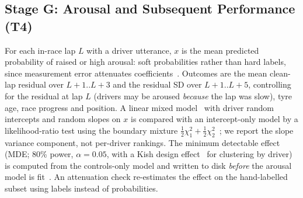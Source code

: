 \subsection{Stage G: Arousal and Subsequent Performance (T4)}
For each in-race lap $L$ with a driver utterance, $x$ is the mean predicted probability of raised or high arousal: soft probabilities rather than hard labels, since measurement error attenuates coefficients~\cite{fuller1987measurement}. Outcomes are the mean clean-lap residual over $L{+}1..L{+}3$ and the residual SD over $L{+}1..L{+}5$, controlling for the residual at lap $L$ (drivers may be aroused \emph{because} the lap was slow), tyre age, race progress and position. A linear mixed model~\cite{seabold2010statsmodels} with driver random intercepts and random slopes on $x$ is compared with an intercept-only model by a likelihood-ratio test using the boundary mixture $\tfrac12\chi^2_1+\tfrac12\chi^2_2$~\cite{self1987lrt}; we report the slope variance component, not per-driver rankings. The minimum detectable effect (MDE; 80\% power, $\alpha=0.05$, with a Kish design effect~\cite{kish1965survey} for clustering by driver) is computed from the controls-only model and written to disk \emph{before} the arousal model is fit~\cite{simmons2011false}. An attenuation check re-estimates the effect on the hand-labelled subset using labels instead of probabilities.

